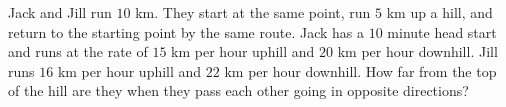 Jack and Jill run $10$ km. They start at the same point, run $5$ km up a hill, and return to the starting point by the same route. Jack has a $10$ minute head start and runs at the rate of $15$ km per hour uphill and $20$ km per hour downhill. Jill runs $16$ km per hour uphill and $22$ km per hour downhill. How far from the top of the hill are they when they pass each other going in opposite directions?
